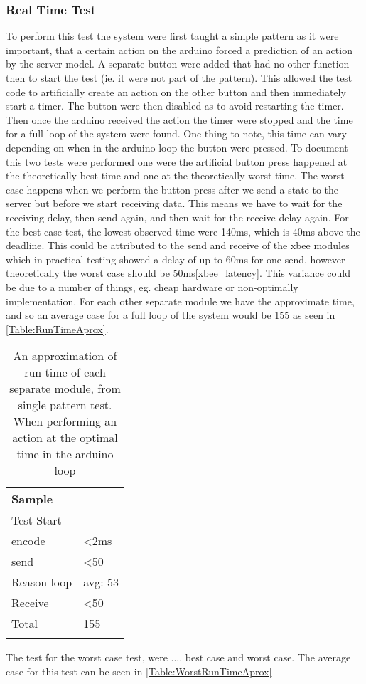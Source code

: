 \subsubsection{Real Time Test}
To perform this test the system were first taught a simple pattern as it were important, that a certain action on the arduino forced a prediction of an action by the server model. A separate button were added that had no other function then to start the test (ie. it were not part of the pattern). This allowed the test code to artificially create an action on the other button and then immediately start a timer. The button were then disabled as to avoid restarting the timer. Then once the arduino received the action the timer were stopped and the time for a full loop of the system were found. One thing to note, this time can vary depending on when in the arduino loop the button were pressed. To document this two tests were performed one were the artificial button press happened at the theoretically best time and one at the theoretically worst time. The worst case happens when we perform the button press after we send a state to the server but before we start receiving data. This means we have to wait for the receiving delay, then send again, and then wait for the receive delay again. For the best case test, the lowest observed time were 140ms, which is 40ms above the deadline. This could be attributed to the send and receive of the xbee modules which in practical testing showed a delay of up to 60ms for one send, however theoretically the worst case should be 50ms\cref{xbee_latency}. This variance could be due to a number of things, eg. cheap hardware or non-optimally implementation. For each other separate module we have the approximate time, and so an average case for a full loop of the system would be 155 as seen in \cref{Table:RunTimeAprox}.
\begin{center}
	\begin{table}[htbp]
	  \centering
	  \begin{tabular}{l | l}
		\toprule
		Sample  		& 			\\ \midrule
		Test Start		&     \\
		encode 			& <2ms  	\\
		send   			& <50  		\\
		Reason loop 	& avg: 53 	\\
		Receive 		& <50  		\\
		Total			& 155		\\
									\\ \bottomrule
	  \end{tabular}
	  \caption{An approximation of run time of each separate module, from single pattern test. When performing an action at the optimal time in the arduino loop}
	\end{table}
 \label{Table:RunTimeAprox}
\end{center}
The test for the worst case test, were .... best case and worst case.
The average case for this test can be seen in \cref{Table:WorstRunTimeAprox}

